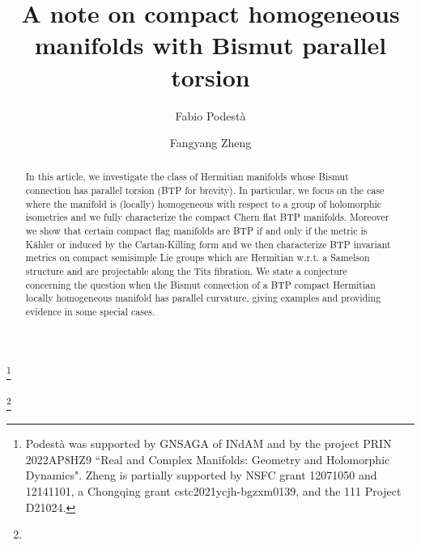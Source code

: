 \documentclass{amsart}
\numberwithin{equation}{section}
\theoremstyle{definition}
\renewcommand{\1}{\mathds{1}}
\renewcommand{\>}{\rightarrow}
\begin{document}
\title{A note on compact homogeneous manifolds with Bismut parallel torsion}

\begin{abstract}
In this article, we investigate the class of Hermitian manifolds whose Bismut connection has parallel torsion ({\rm BTP} for brevity). In particular, we focus on the case where the manifold is (locally) homogeneous with respect to a group of holomorphic isometries and we fully characterize the compact Chern flat {\rm BTP} manifolds. Moreover we show that certain compact flag manifolds are {\rm BTP} if and only if the metric is K\"ahler or induced by the Cartan-Killing form and we then characterize {\rm BTP} invariant metrics on compact semisimple Lie groups which are Hermitian w.r.t. a Samelson structure and are projectable along the Tits fibration. We state a conjecture concerning the question when the Bismut connection of a  BTP compact Hermitian locally homogeneous manifold has parallel curvature, giving examples and providing evidence in some special cases.
\end{abstract}

\author{Fabio Podest\`a}
\address{Fabio Podest\`a. Dipartimento di Matematica e Informatica ``U. Dini", Universit\`a degli Studi di Firenze,
Viale Morgagni 67/a, 50134 Firenze, Italy.} 
\thanks{Podest\`a was supported by GNSAGA of INdAM and by the project PRIN 2022AP8HZ9 ``Real and Complex
Manifolds: Geometry and Holomorphic Dynamics". Zheng is partially supported by NSFC grant 12071050 and 12141101, a Chongqing grant cstc2021ycjh-bgzxm0139, and the 111 Project D21024.}

\author{Fangyang Zheng}
\address{Fangyang Zheng. School of Mathematical Sciences, Chongqing Normal University, Chongqing 401331, China}
 \thanks{}



\maketitle

\tableofcontents
\end{document}
